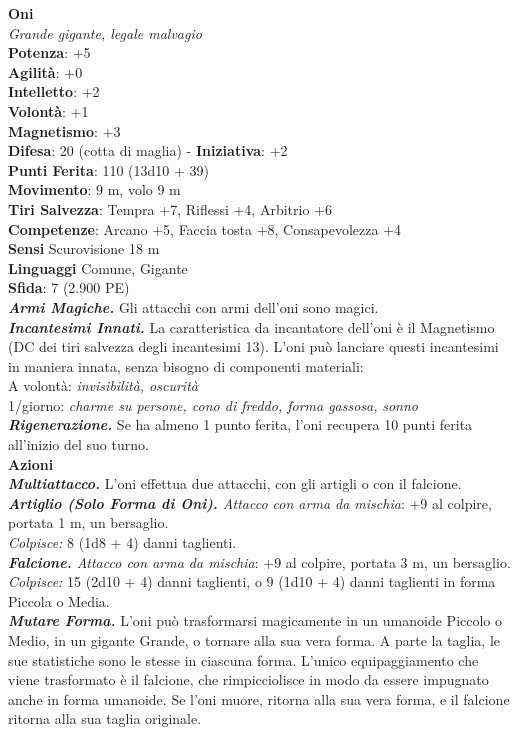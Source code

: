 \begin{multicols}{2}
\medskip\textbf{Oni}\\
\emph{Grande gigante, legale malvagio}\\
\textbf{Potenza}: +5\\
\textbf{Agilità}: +0\\
\textbf{Intelletto}: +2\\
\textbf{Volontà}: +1\\
\textbf{Magnetismo}: +3\\
\textbf{Difesa}: 20 (cotta di maglia) - \textbf{Iniziativa}: +2\\
\textbf{Punti Ferita}: 110 (13d10 + 39)\\
\textbf{Movimento}: 9 m, volo 9 m  \\
\textbf{Tiri Salvezza}: Tempra +7, Riflessi +4, Arbitrio +6\\
\textbf{Competenze}: Arcano +5, Faccia tosta +8, Consapevolezza +4\\
\textbf{Sensi} Scurovisione 18 m\\
\textbf{Linguaggi} Comune, Gigante\\
\textbf{Sfida}: 7 (2.900 PE)\smallskip\\
\emph{\textbf{Armi Magiche.}} Gli attacchi con armi dell'oni sono magici.\\
\emph{\textbf{Incantesimi Innati.}} La caratteristica da incantatore dell'oni è il Magnetismo (DC dei tiri salvezza degli incantesimi 13). L'oni può lanciare questi incantesimi in maniera innata, senza bisogno di componenti materiali:\\
A volontà: \emph{invisibilità, oscurità}\\
1/giorno: \emph{charme su persone, cono di freddo, forma gassosa,} \emph{sonno}\\
\emph{\textbf{Rigenerazione.}} Se ha almeno 1 punto ferita, l'oni recupera 10 punti ferita all'inizio del suo turno.\\
\smallskip\textbf{Azioni}\\
\emph{\textbf{Multiattacco.}} L'oni effettua due attacchi, con gli artigli o con il falcione.\\
\emph{\textbf{Artiglio (Solo Forma di Oni).} Attacco con arma da mischia}: +9 al colpire, portata 1 m, un bersaglio.\\
\emph{Colpisce:} 8 (1d8 + 4) danni taglienti.\\
\emph{\textbf{Falcione.} Attacco con arma da mischia}: +9 al colpire, portata 3 m, un bersaglio.\\
\emph{Colpisce:} 15 (2d10 + 4) danni taglienti, o 9 (1d10 + 4) danni taglienti in forma Piccola o Media.\\
\emph{\textbf{Mutare Forma.}} L'oni può trasformarsi magicamente in un umanoide Piccolo o Medio, in un gigante Grande, o tornare alla sua vera forma. A parte la taglia, le sue statistiche sono le stesse in ciascuna forma. L'unico equipaggiamento che viene trasformato è il falcione, che rimpicciolisce in modo da essere impugnato anche in forma umanoide. Se l'oni muore, ritorna alla sua vera forma, e il falcione ritorna alla sua taglia originale.\\


\end{multicols}
